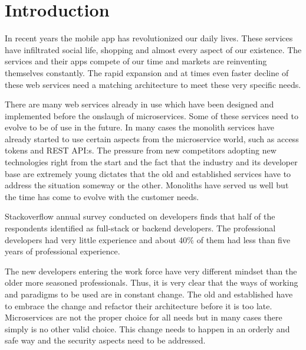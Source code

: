 


\section{Introduction}
\begin{sloppypar}

    In recent years the mobile app has revolutionized our daily lives. 
    These services have infiltrated social life, shopping and almost 
    every aspect of our existence. The services and their apps compete of 
    our time and markets are reinventing themselves constantly. The rapid 
    expansion and at times even faster decline of these web services 
    need a matching architecture to meet these very specific needs. 

    There are many web services already in use which have been designed and 
    implemented before the onslaugh of microservices. Some of these services 
    need to evolve to be of use in the future. In many cases the monolith 
    services have already started to use certain aspects from the microservice 
    world, such as access tokens and REST API:s. The pressure from new 
    competitors adopting new technologies right from the start and the fact 
    that the industry and its developer base are extremely young dictates that 
    the old and established services have to address the situation someway or 
    the other. Monoliths have served us well but the time has come to evolve 
    with the customer needs.

    Stackoverflow annual survey \citep{stackoverflowsurvey2019} conducted on 
    developers finds that half of the respondents identified as full-stack or 
    backend developers. The professional developers had very little experience 
    and about 40\% of them had less than five years of professional experience. 

    The new developers entering the work force have very different mindset than 
    the older more seasoned professionals. Thus, it is very clear that the ways 
    of working and paradigms to be used are in constant change. The old and 
    established have to embrace the change and refactor their architecture 
    before it is too late. Microservices are not the proper choice for all needs
     \citep{newman2019} but in many cases there simply is no other valid choice.
    This change needs to happen in an orderly and safe way and the security 
    aspects need to be addressed. 


\end{sloppypar}
